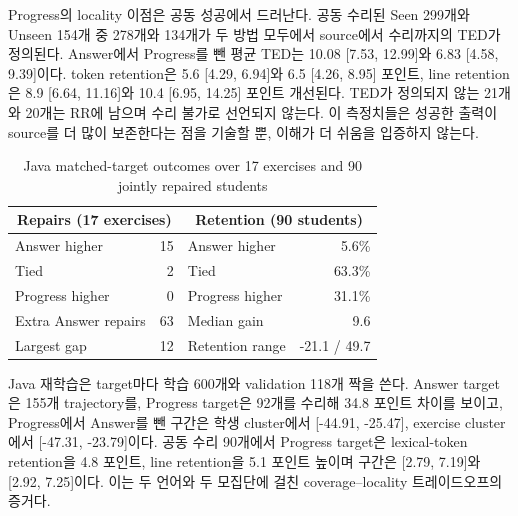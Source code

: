 \documentclass[10pt,conference]{IEEEtran}
\begin{document}
Progress의 locality 이점은 공동 성공에서 드러난다. 공동 수리된 Seen 299개와 Unseen 154개 중 278개와 134개가 두 방법 모두에서 source에서 수리까지의 TED가 정의된다. Answer에서 Progress를 뺀 평균 TED는 10.08 [7.53, 12.99]와 6.83 [4.58, 9.39]이다. token retention은 5.6 [4.29, 6.94]와 6.5 [4.26, 8.95] 포인트, line retention은 8.9 [6.64, 11.16]와 10.4 [6.95, 14.25] 포인트 개선된다. TED가 정의되지 않는 21개와 20개는 RR에 남으며 수리 불가로 선언되지 않는다. 이 측정치들은 성공한 출력이 source를 더 많이 보존한다는 점을 기술할 뿐, 이해가 더 쉬움을 입증하지 않는다.



\begin{table}[h]
\caption{Java matched-target outcomes over 17 exercises and 90 jointly repaired students}
\label{tab:uneven}
\centering\small
\begin{tabular}{@{}lr||lr@{}}
\toprule
\multicolumn{2}{c||}{Repairs (17 exercises)} & \multicolumn{2}{c}{Retention (90 students)} \\
\midrule
Answer higher & 15 & Answer higher & 5.6\% \\
Tied & 2 & Tied & 63.3\% \\
Progress higher & 0 & Progress higher & 31.1\% \\
Extra Answer repairs & 63 & Median gain & 9.6 \\
Largest gap & 12 & Retention range & -21.1 / 49.7 \\
\bottomrule
\end{tabular}
\end{table}

Java 재학습은 target마다 학습 600개와 validation 118개 짝을 쓴다. Answer target은 155개 trajectory를, Progress target은 92개를 수리해 34.8 포인트 차이를 보이고, Progress에서 Answer를 뺀 구간은 학생 cluster에서 [-44.91, -25.47], exercise cluster에서 [-47.31, -23.79]이다. 공동 수리 90개에서 Progress target은 lexical-token retention을 4.8 포인트, line retention을 5.1 포인트 높이며 구간은 [2.79, 7.19]와 [2.92, 7.25]이다. 이는 두 언어와 두 모집단에 걸친 coverage--locality 트레이드오프의 증거다.
\end{document}
